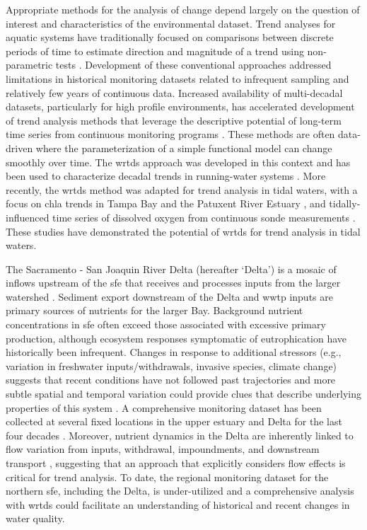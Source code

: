 \documentclass[letterpaper,12pt,oneside]{article}\usepackage[]{graphicx}\usepackage[]{color}
\begin{document}
Appropriate methods for the analysis of change depend largely on the question of interest and characteristics of the environmental dataset.  Trend analyses for aquatic systems have traditionally focused on comparisons between discrete periods of time to estimate direction and magnitude of a trend using non-parametric tests \cite{Hirsch91,Esterby96}. Development of these conventional approaches addressed limitations in historical monitoring datasets related to infrequent sampling and relatively few years of continuous data. Increased availability of multi-decadal datasets, particularly for high profile environments, has accelerated development of trend analysis methods that leverage the descriptive potential of long-term time series from continuous monitoring programs \cite{Bowes09,Halliday12}. These methods are often data-driven where the parameterization of a simple functional model can change smoothly over time.  The \ac{wrtds} approach was developed in this context and has been used to characterize decadal trends in running-water systems \cite{Hirsch10,Sprague11,Medalie12,Hirsch14,Pellerin14,Zhang16}. More recently, the \ac{wrtds} method was adapted for trend analysis in tidal waters, with a focus on \ac{chla} trends in Tampa Bay \cite{Beck15} and the Patuxent River Estuary \cite{Beck17}, and tidally-influenced time series of dissolved oxygen from continuous sonde measurements \cite{Beck15b}. These studies have demonstrated the potential of \ac{wrtds} for trend analysis in tidal waters.

The Sacramento - San Joaquin River Delta (hereafter `Delta') is a mosaic of inflows upstream of the \ac{sfe} that receives and processes inputs from the larger watershed \cite{Jassby00,Jassby02,Jassby08}. Sediment export downstream of the Delta and \ac{wwtp} inputs are primary sources of nutrients for the larger Bay.  Background nutrient concentrations in \ac{sfe} often exceed those associated with excessive primary production, although ecosystem responses symptomatic of eutrophication have historically been infrequent.  Changes in response to additional stressors (e.g., variation in freshwater inputs/withdrawals, invasive species, climate change) suggests that recent conditions have not followed past trajectories and more subtle spatial and temporal variation could provide clues that describe underlying properties of this system \cite{Cloern12b}.  A comprehensive monitoring dataset has been collected at several fixed locations in the upper estuary and Delta for the last four decades \cite{Jabusch16}.  Moreover, nutrient dynamics in the Delta are inherently linked to flow variation from inputs, withdrawal, impoundments, and downstream transport \cite{Novick15}, suggesting that an approach that explicitly considers flow effects is critical for trend analysis.  To date, the regional monitoring dataset for the northern \ac{sfe}, including the Delta, is under-utilized and a comprehensive analysis with \ac{wrtds} could facilitate an understanding of historical and recent changes in water quality.
\end{document}
